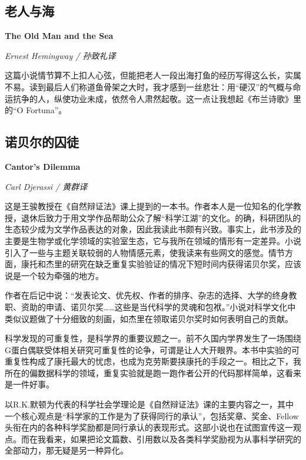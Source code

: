 \subsection*{老人与海}
\par \textbf{The Old Man and the Sea}
\par \emph{Ernest Hemingway / 孙致礼译} 
\par 这篇小说情节算不上扣人心弦，但能把老人一段出海打鱼的经历写得这么长，实属不易。读到最后人们称道鱼骨架之大时，我才感到一丝悲壮：用“硬汉”的气概与命运抗争的人，纵使功业未成，依然令人肃然起敬。这一点让我想起《布兰诗歌》里的“O Fortuna”。
\par {}

\subsection*{诺贝尔的囚徒}
\par \textbf{Cantor’s Dilemma}
\par \emph{Carl Djerassi / 黄群译} 
\par 这是王骏教授在《自然辩证法》课上提到的一本书。作者本人是一位知名的化学教授，退休后致力于用文学作品帮助公众了解“科学江湖”的文化。的确，科研团队的生态较少成为文学作品表达的对象，因此我读此书颇有兴致。事实上，此书涉及的主要是生物学或化学领域的实验室生态，它与我所在领域的情形有一定差异。小说引入了一些与主题关联较弱的人物情感元素，使我读来有些网文的感觉。情节方面，康托和杰里的研究在缺乏重复实验验证的情况下短时间内获得诺贝尔奖，应该说是一个较为牵强的地方。
\par 作者在后记中说：“发表论文、优先权、作者的排序、杂志的选择、大学的终身教职、资助的申请、诺贝尔奖……这些是当代科学的灵魂和包袱。”小说对科学文化中类似议题做了十分细致的刻画，如杰里在领取诺贝尔奖时如何表明自己的贡献。
\par 科学发现的可重复性，是科学界的重要议题之一。前不久国内学界发生了一场围绕G蛋白偶联受体相关研究可重复性的论争，可谓是让人大开眼界。本书中实验的可重复性构成了康托最大的忧虑，也成为克劳斯要挟康托的手段之一。相比之下，我所在的偏数据科学的领域，重复实验就是跑一跑作者公开的代码那样简单，这看来是一件好事。
\par 以R.K.默顿为代表的科学社会学理论是《自然辩证法》课的主要内容之一，其中一个核心观点是“科学家的工作是为了获得同行的承认”，包括奖章、奖金、Fellow头衔在内的各种科学奖励都是同行承认的表现形式。这部小说也在试图宣传这一观点。而在我看来，如果把论文篇数、引用数以及各类科学奖励视为从事科学研究的全部动力，那无疑是另一种异化。
\par {}

